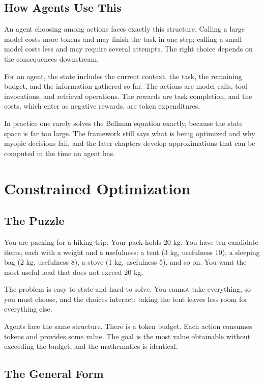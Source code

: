 \documentclass[11pt]{book}
\begin{document}
\subsection{How Agents Use This}

An agent choosing among actions faces exactly this structure. Calling a large model costs more tokens and may finish the task in one step; calling a small model costs less and may require several attempts. The right choice depends on the consequences downstream.

For an agent, the state includes the current context, the task, the remaining budget, and the information gathered so far. The actions are model calls, tool invocations, and retrieval operations. The rewards are task completion, and the costs, which enter as negative rewards, are token expenditures.

In practice one rarely solves the Bellman equation exactly, because the state space is far too large. The framework still says what is being optimized and why myopic decisions fail, and the later chapters develop approximations that can be computed in the time an agent has.

\section{Constrained Optimization}

\subsection{The Puzzle}

You are packing for a hiking trip. Your pack holds 20 kg. You have ten candidate items, each with a weight and a usefulness: a tent (3 kg, usefulness 10), a sleeping bag (2 kg, usefulness 8), a stove (1 kg, usefulness 5), and so on. You want the most useful load that does not exceed 20 kg.

The problem is easy to state and hard to solve. You cannot take everything, so you must choose, and the choices interact: taking the tent leaves less room for everything else.

Agents face the same structure. There is a token budget. Each action consumes tokens and provides some value. The goal is the most value obtainable without exceeding the budget, and the mathematics is identical.

\subsection{The General Form}
\end{document}

